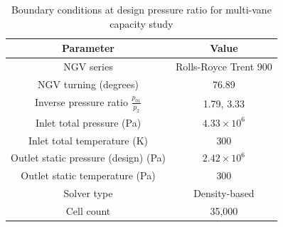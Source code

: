 \documentclass[a4paper, 11pt, oneside]{report}
\begin{document}
\begin{table}[H]
\caption{Boundary conditions at design pressure ratio for multi-vane capacity study}
\label{T900_parameters}
\begin{center}
\begin{tabular}{|c|c|}
\hline
Parameter & Value\\
\hline
NGV series & Rolls-Royce Trent 900\\
NGV turning (degrees) & 76.89\\
Inverse pressure ratio $\frac{p_{01}}{p_2}$ & 1.79, 3.33\\
Inlet total pressure (Pa) & $4.33 \times 10^6$\\
Inlet total temperature (K) & 300\\
Outlet static pressure (design) (Pa) & $2.42 \times 10^6$\\
Outlet static temperature (Pa) & 300\\
Solver type & Density-based\\
Cell count & 35,000\\
\hline
\end{tabular}
\end{center}
\end{table}
\end{document}
